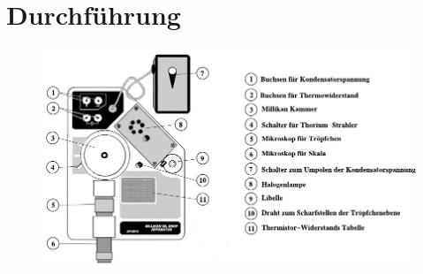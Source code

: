 \section{Durchführung}
\label{sec:durchführung}

\begin{figure}[H]
	\centering
	\includegraphics[width=0.95\linewidth]{content/grafik/aufbau.pdf}
	\caption{}
	\label{fig:aufbau}
\end{figure}

